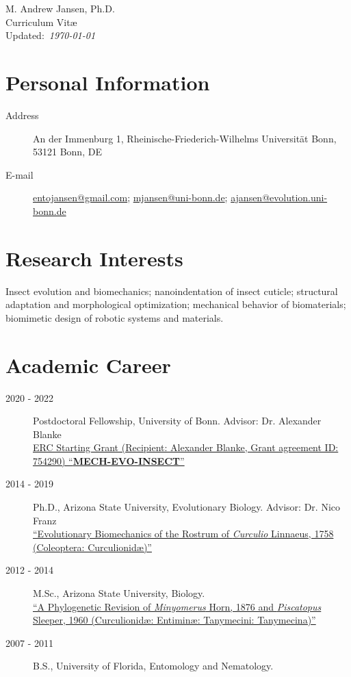 \documentclass[12pt,a4paper]{article}
\begin{document}
\vspace*{-2cm}
\begin{center}
	{\LARGE M. Andrew Jansen, Ph.D.}\\
	\medskip
	{\Large Curriculum Vit\ae}\\
	Updated:~\textit{\today}
\end{center}

\section*{Personal Information}
	\begin{description}
		\item [Address] \tabto*{2cm} An der Immenburg 1, Rheinische-Friederich-Wilhelms Universit\"{a}t Bonn, 53121 Bonn, DE
		\item [E-mail] \tabto*{2cm} \href{mailto:entojansen@gmail.com}{entojansen@gmail.com}; \href{mailto:mjansen@uni-bonn.de}{mjansen@uni-bonn.de}; \href{mailto:ajansen@evolution.uni-bonn.de}{ajansen@evolution.uni-bonn.de}
	\end{description}

\section*{Research Interests}
	Insect evolution and biomechanics;
	nanoindentation of insect cuticle;
	structural adaptation and morphological optimization;
	mechanical behavior of biomaterials;
	biomimetic design of robotic systems and materials.

\section*{Academic Career}
	\begin{description}
		\item [2020 - 2022] Postdoctoral Fellowship, University of Bonn. Advisor: Dr. Alexander Blanke
		\\ \href{https://cordis.europa.eu/project/id/754290}{ERC Starting Grant (Recipient: Alexander Blanke, Grant agreement ID: 754290) ``\textbf{MECH-EVO-INSECT}''}
		\item [2014 - 2019] Ph.D., Arizona State University, Evolutionary Biology. Advisor: Dr. Nico Franz
		\\ \href{https://repository.asu.edu/items/53836}{``Evolutionary Biomechanics of the Rostrum of \textit{Curculio} Linnaeus, 1758
		(Coleoptera: Curculionid\ae)''}
		\item [2012 - 2014] M.Sc., Arizona State University, Biology.
		\\ \href{https://repository.asu.edu/items/25115}{``A Phylogenetic Revision of \textit{Minyomerus} Horn, 1876 and \textit{Piscatopus} Sleeper, 1960
		(Curculionid\ae: Entimin\ae: Tanymecini: Tanymecina)''}
		\item [2007 - 2011] B.S., University of Florida, Entomology and Nematology.
	\end{description}
\end{document}
